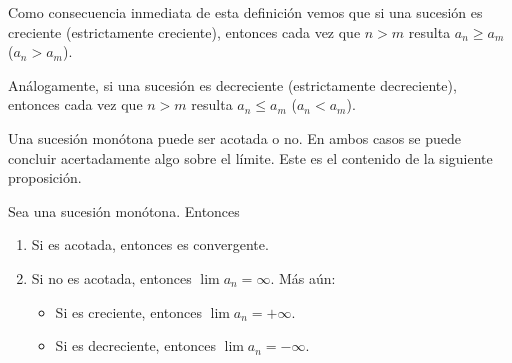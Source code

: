 Como consecuencia inmediata de esta definición vemos que si una sucesión \sucan es creciente (estrictamente creciente), entonces cada vez que $n>m$ resulta $a_n\ge a_m$ ($a_n > a_m$). 

Análogamente, si una sucesión \sucan es decreciente (estrictamente decreciente), entonces cada vez que $n>m$ resulta $a_n\le a_m$ ($a_n < a_m$).

Una sucesión monótona puede ser acotada o no. En ambos casos se puede concluir acertadamente algo sobre el límite. Este es el contenido de la siguiente proposición.

\begin{proposition}\label{P:sucesion monotona acotada}
    Sea \sucan una sucesión monótona. Entonces
    \begin{enumerate}[{\bf (a)}]
        \item Si \sucan es acotada, entonces \sucan es convergente.
        \item Si \sucan no es acotada, entonces $\lim a_n = \infty$. Más aún:
        \begin{itemize}
            \item Si \sucan es creciente, entonces $\lim a_n = +\infty$.
            \item Si \sucan es decreciente, entonces $\lim a_n = -\infty$.
        \end{itemize}
    \end{enumerate}
\end{proposition}


